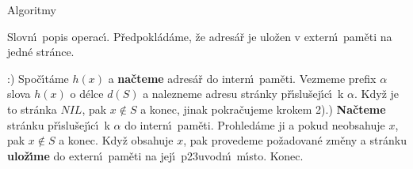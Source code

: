 \subhead
Algoritmy
\endsubhead
\smallskip

\flushpar Slovn\'\i\ popis operac\'\i . P\v redpokl\'ad\'ame, \v ze adres\'a\v r 
je ulo\v zen v extern\'\i\ pam\v eti na jedn\'e str\'ance.
\medskip

:) Spo\v c\'\i t\'ame $h\left(x\right)$ a {\bf na\v cteme} adres\'a\v r do intern\'\i\ pam\v eti. 
Vez\-me\-me prefix $\alpha$ slova $h\left(x\right)$ o d\'elce $d\left(S\right)$ a nalezneme 
adresu str\'anky p\v r\'\i slu\v sej\'\i c\'\i\ k $\alpha$. Kdy\v z je to str\'anka 
$NIL$, pak $x\notin S$ a konec, jinak pokra\v cujeme krokem 
2).) {\bf Na\v cteme} str\'anku p\v r\'\i slu\v sej\'\i c\'\i\ k $\alpha$ do intern\'\i\ 
pam\v eti. Prohle\-d\'a\-me ji a pokud neobsahuje $x$, pak $x\notin 
S$ a 
konec. Kdy\v z obsahuje $x$, pak provedeme po\v zadovan\'e 
zm\v eny a str\'anku {\bf ulo\-\v z\'\i\-me} do extern\'\i\ pam\v eti na jej\'\i\ 
p\accent23uvodn\'\i\ m\'\i sto. Konec.
\medskip

